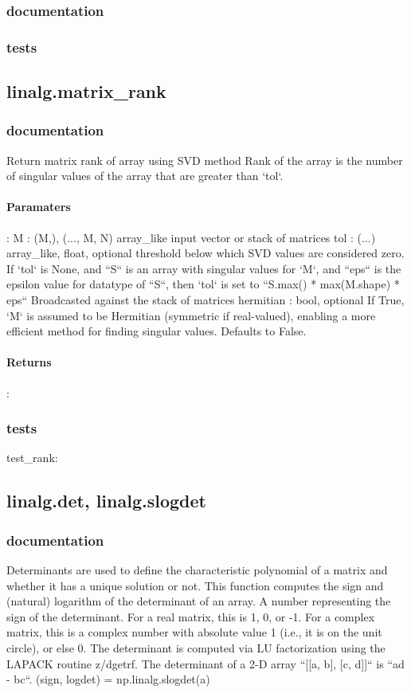 \documentclass[a4paper,11pt]{article}
\begin{document}
\subsubsection{documentation}
\subsubsection{tests}


\subsection{linalg.matrix\_rank}
\subsubsection{documentation}
Return matrix rank of array using SVD method
Rank of the array is the number of singular values of the array that are
greater than `tol`.
\paragraph{Paramaters}:  M : {(M,), (..., M, N)} array\_like input vector or stack of matrices
tol : (...) array\_like, float, optional
threshold below which SVD values are considered zero. If `tol` is None, and ``S`` is an array with singular values for `M`, and ``eps`` is the epsilon value for datatype of ``S``, then `tol` is set to ``S.max() * max(M.shape) * eps`` Broadcasted against the stack of matrices hermitian : bool, optional If True, `M` is assumed to be Hermitian (symmetric if real-valued),
enabling a more efficient method for finding singular values. Defaults to False.
\paragraph{Returns}: 
\subsubsection{tests}
test\_rank:  


\subsection{linalg.det, linalg.slogdet}
\subsubsection{documentation}
Determinants are used to define the characteristic polynomial of a matrix and whether it has a unique solution or not. This function computes the sign and (natural) logarithm of the determinant of an array. A number representing the sign of the determinant. For a real matrix,
this is 1, 0, or -1. For a complex matrix, this is a complex number with absolute value 1 (i.e., it is on the unit circle), or else 0. The determinant is computed via LU factorization using the LAPACK
routine z/dgetrf. The determinant of a 2-D array ``[[a, b], [c, d]]`` is ``ad - bc``. (sign, logdet) = np.linalg.slogdet(a)
\end{document}
